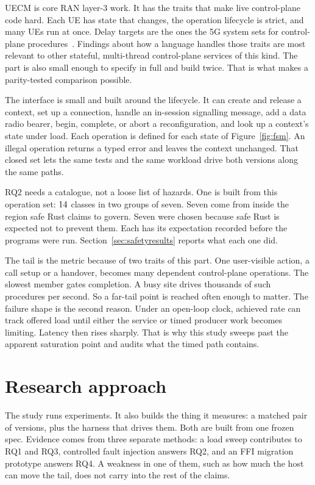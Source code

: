 \documentclass[english,oneside,a4paper,censored,csm,software-track-2020]{HYthesisML}
\begin{document}
UECM is core RAN layer-3 work. It has the traits that make live control-plane
code hard. Each UE has state that changes, the operation lifecycle is strict,
and many UEs run at once. Delay targets are the ones the 5G system sets for
control-plane procedures~\cite{3gpp38913,3gpp22261}. Findings about how a language
handles those traits are most relevant to other stateful, multi-thread
control-plane services of this kind. The part is also small enough to specify in full and build twice.
That is what makes a parity-tested comparison possible.

The interface is small and built around the lifecycle. It can create and
release a context, set up a connection, handle an in-session signalling
message, add a data radio bearer, begin, complete, or abort a
reconfiguration, and look up a context's state under load. Each
operation is defined for each state of Figure~\ref{fig:fsm}. An illegal operation
returns a typed error and leaves the context unchanged. That closed set lets
the same tests and the same workload drive both versions along the same
paths.

RQ2 needs a catalogue, not a loose list of hazards. One is built from this
operation set: $14$ classes in two groups of seven. Seven come from inside
the region safe Rust claims to govern. Seven were chosen because safe Rust is
expected not to prevent them. Each has its expectation recorded before the
programs were run. Section~\ref{sec:safetyresults} reports what each one did.

The tail is the metric because of two traits of this part. One user-visible
action, a call setup or a handover, becomes many dependent control-plane
operations. The slowest member gates completion. A busy site drives thousands of
such procedures per second. So a far-tail point is reached often enough to
matter. The failure shape is the second reason. Under an open-loop clock,
achieved rate can track offered load until either the service or timed
producer work becomes limiting. Latency then rises sharply. That is why this
study sweeps past the apparent saturation point and audits what the timed
path contains.

\section{Research approach}\label{sec:approach}
The study runs experiments. It also builds the thing it measures: a matched
pair of versions, plus the harness that drives them. Both are built from one
frozen spec. Evidence comes from three separate methods: a load sweep contributes to
RQ1 and RQ3, controlled fault injection answers RQ2, and an FFI migration
prototype answers RQ4. A weakness in one of them, such as how much the host
can move the tail, does not carry into the rest of the claims.
\end{document}
